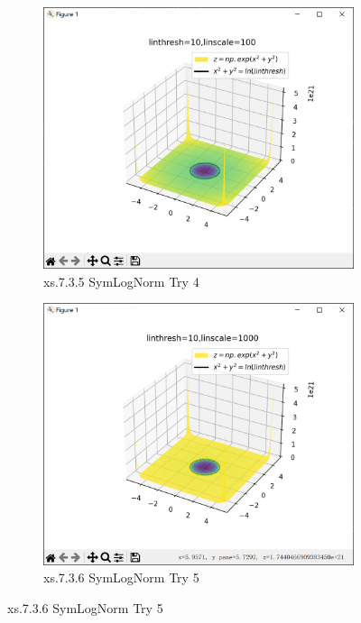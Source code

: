 \documentclass[12pt]{article}
\begin{document}
\begin{figure}[H]
    \centering
    \begin{subfigure}[b]{0.48\textwidth}
        \includegraphics[width=\textwidth]{norm PIc2.4.png} %
        \caption{xs.7.3.5 SymLogNorm Try 4}
        \label{fig:line-graph2}
    \end{subfigure}
    \hfill
    \begin{subfigure}[b]{0.48\textwidth}
        \includegraphics[width=\textwidth]{norm PIc2.5.png} %
        \caption{xs.7.3.6 SymLogNorm Try 5}
        \label{fig:line-graph2-pic2}
    \end{subfigure}
\end{figure}
\end{document}
